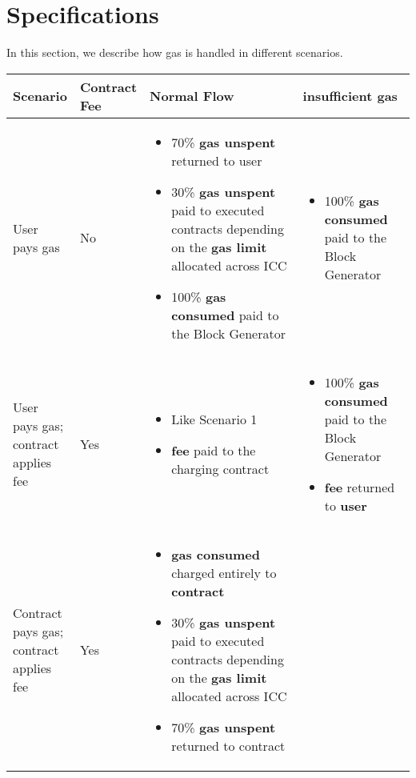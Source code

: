 \documentclass[twocolumn, nofootinbib]{revtex4-2} %
\newcommand{\emphathize}[1]{\textbf{#1}\xspace}
\newcommand{\contract}{\emphathize{contract}}
\newcommand{\fee}{\emphathize{fee}}
\newcommand{\gaslimit}{\emphathize{gas limit}}
\newcommand{\gasconsumed}{\emphathize{gas consumed}}
\newcommand{\gasunspent}{\emphathize{gas unspent}}
\newcommand{\insufficientgas}{\emphathize{insufficient gas}}
\newcommand{\user}{\emphathize{user}}
\begin{document}
    \section{Specifications}\label{sec:specifications}
	In this section, we describe how gas is handled in different scenarios.
    \begin{table*}[t]
    \begin{tabular}{|m{0.15\linewidth}|m{0.1\linewidth}|m{0.45\linewidth}|m{0.3\linewidth}|}
        \hline
        \textbf{Scenario} & \textbf{Contract Fee} &
        \textbf{Normal Flow} & \insufficientgas \\
        \hline
        \hline
        User pays gas & No &
        \begin{itemize}
            \item 70\% \gasunspent returned to user
            \item 30\% \gasunspent paid to executed contracts depending
                  on the \gaslimit allocated across ICC
            \item 100\% \gasconsumed paid to the Block Generator
        \end{itemize} &
        \begin{itemize}
            \item 100\% \gasconsumed paid to the Block Generator
        \end{itemize} \\
        \hline
        User pays gas; contract applies fee & Yes &
        \begin{itemize}
            \item Like Scenario 1
            \item \fee paid to the charging contract
        \end{itemize} &
        \begin{itemize}
            \item 100\% \gasconsumed paid to the Block Generator
            \item \fee returned to \user
        \end{itemize} \\
        \hline
        Contract pays gas; contract applies fee & Yes &
        \begin{itemize}
            \item \gasconsumed charged entirely to \contract
            \item 30\% \gasunspent paid to executed contracts depending
                  on the \gaslimit allocated across ICC
            \item 70\% \gasunspent returned to contract

\end{itemize}
\end{tabular}
\end{table*}
\end{document}
